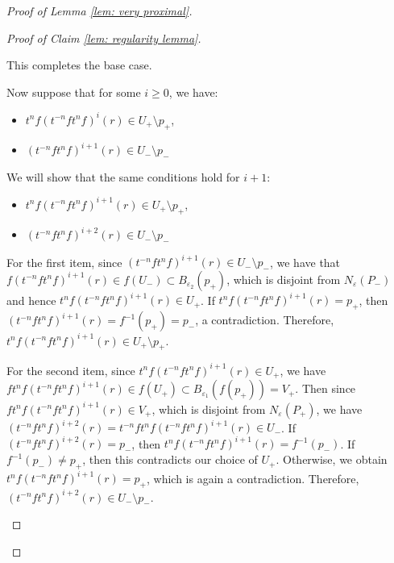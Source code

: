 \documentclass[12pt]{article}
\theoremstyle{definition}
\newcommand{\ve}{\varepsilon}
\begin{document}
\begin{proof} [Proof of Lemma \ref{lem: very proximal}]
\begin{proof}[Proof of Claim \ref{lem: regularity lemma}]
\begin{enumerate}
\begin{enumerate}
\begin{enumerate}
    This completes the base case. 

    Now suppose that for some $i \geq 0$, we have: 
    
     \begin{itemize} 
        \item $t^n f(t^{-n}f t^n f)^i(r) \in U_+ \setminus p_+$,
        \item $(t^{-n}f t^n f)^{i+1}(r) \in U_- \setminus p_-$
    \end{itemize}
    
    We will show that the same conditions hold for $i+1$:

     \begin{itemize} 
        \item $t^n f(t^{-n}f t^n f)^{i+1}(r) \in U_+ \setminus p_+$,
        \item $(t^{-n}f t^n f)^{i+2}(r) \in U_- \setminus p_-$
    \end{itemize}

    For the first item, since $(t^{-n}f t^n f)^{i+1}(r) \in U_- \setminus p_-$, we have that $f(t^{-n}f t^n f)^{i+1}(r) \in f(U_-) \subset B_{\ve_2}(p_+)$, which is disjoint from $N_{\ve}(P_-)$ and hence $t^nf(t^{-n}f t^n f)^{i+1}(r) \in U_+$. If $t^nf(t^{-n}f t^n f)^{i+1}(r) = p_+$, then $(t^{-n}f t^n f)^{i+1}(r) = f^{-1}(p_+) = p_-$, a contradiction. Therefore, $t^nf(t^{-n}f t^n f)^{i+1}(r) \in U_+ \setminus p_+$. 

    For the second item, since $t^n f(t^{-n}f t^n f)^{i+1}(r) \in U_+$, we have $ft^n f(t^{-n}f t^n f)^{i+1}(r) \in f(U_+) \subset B_{\ve_1}(f(p_+)) = V_+$. Then since $ft^n f(t^{-n}f t^n f)^{i+1}(r) \in V_+$, which is disjoint from $N_{\ve}(P_+)$, we have $(t^{-n}f t^n f)^{i+2}(r) = t^{-n}ft^n f(t^{-n}f t^n f)^{i+1}(r) \in U_-$. If $(t^{-n}f t^n f)^{i+2}(r) = p_-$, then $t^n f(t^{-n}f t^n f)^{i+1}(r) = f^{-1}(p_-)$. If $f^{-1}(p_-) \neq p_+$, then this contradicts our choice of $U_+$. Otherwise, we obtain $t^n f(t^{-n}f t^n f)^{i+1}(r) = p_+$, which is again a contradiction. Therefore, $(t^{-n}f t^n f)^{i+2}(r) \in U_- \setminus p_-$. 


\end{enumerate}
\end{enumerate}
\end{enumerate}
\end{proof}
\end{proof}
\end{document}
